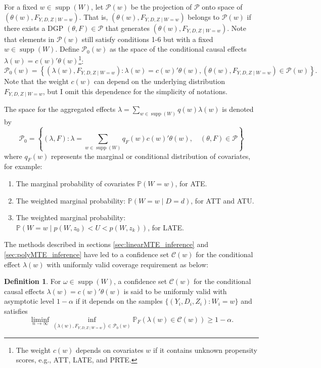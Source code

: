 \documentclass[11pt]{article}
\theoremstyle{definition}
\newtheorem{definition}{Definition}[section]
\DeclareMathOperator*{\supp}{supp}
\newcommand{\Prob}{\ensuremath{\mathbb{P}}} %
\newcommand{\0}{\ensuremath{\mathbf{0}}}
\begin{document}
\begin{bibunit}
For a fixed $w \in \supp(W)$, let $\mathcal{P}(w)$ be the projection of $\mathcal{P}$ onto space of $\left(\theta(w),F_{Y,D,Z\mid W = w}\right)$. That is, $\left(\theta(w),F_{Y,D,Z\mid W = w}\right)$ belongs to $\mathcal{P}(w)$ if there exists a DGP $(\theta,F)\in\mathcal{P}$ that generates $\left(\theta(w),F_{Y,D,Z\mid W = w}\right)$. Note that elements in $\mathcal{P}(w)$ still satisfy conditions 1-6 but with a fixed $w\in\supp(W)$. Define $\mathcal{P}_0(w)$ as the space of the conditional causal effects $\lambda(w) = c(w)'\theta(w)$\footnote{The weight $c(w)$ depends on covariates $w$ if it contains unknown propensity scores, e.g., ATT, LATE, and PRTE.}:
\[
	\mathcal{P}_0(w) = \left\{(\lambda(w), F_{Y,D,Z\mid W=w}): \lambda(w) = c(w)'\theta(w), (\theta(w), F_{Y,D,Z\mid W=w})\in \mathcal{P}(w)\right\}.
\]
Note that the weight $c(w)$ can depend on the underlying distribution $F_{Y,D,Z\mid W = w}$, but I omit this dependence for the simplicity of notations.

The space for the aggregated effects $\lambda = \sum_{w\in\supp(W)}q(w)\lambda(w)$ is denoted by
\[
	\mathcal{P}_0 = \left\{(\lambda, F): \lambda = \sum_{w\in\supp(W)}q_F(w)c(w)'\theta(w), \quad (\theta, F) \in \mathcal{P} \right\}
\]
where $q_F(w)$ represents the marginal or conditional distribution of covariates, for example: 
\begin{enumerate}
	\item The marginal probability of covariates $\Prob(W=w)$, for ATE.
	\item The weighted marginal probability: $\Prob(W=w \mid D=d)$, for ATT and ATU.
	\item The weighted marginal probability: $\Prob(W=w \mid p(W,z_0) < U < p(W,z_k))$, for LATE.
\end{enumerate}


The methods described in sections \ref{sec:linearMTE_inference} and \ref{sec:polyMTE_inference} have led to a confidence set ${\mathcal{C}}(w)$ for the conditional effect $\lambda(w)$ with uniformly valid coverage requirement as below:
\begin{definition}
\label{def:valid_conditional_cs}
For $\omega \in \supp(W)$, a confidence set ${\mathcal{C}}(w)$ for the conditional causal effects $\lambda(w) = c(w)'\theta(w)$ is said to be uniformly valid with asymptotic level $1-\alpha$ if it depends on the samples $\{(Y_i,D_i,Z_i): W_i =w\}$ and satisfies
\[
	\liminf_{n\to\infty} \inf_{(\lambda(w),F_{Y,D,Z\mid W=w})\in\mathcal{P}_0(w)}\Prob_{F}\left(\lambda(w) \in {\mathcal{C}}(w)\right) \geq 1-\alpha.
\]
\end{definition}


\end{bibunit}
\end{document}
